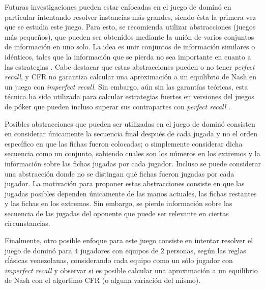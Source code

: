 Futuras investigaciones pueden estar enfocadas en el juego de dominó en particular intentando resolver instancias más grandes, siendo ésta la primera vez que se estudia este juego. Para esto, se recomienda utilizar abstracciones (juegos más pequeños), que pueden ser obtenidos mediante la unión de varios conjuntos de información en uno solo. La idea es unir conjuntos de información similares o idénticos, tales que la información que se pierda no sea importante en cuanto a las estrategias \cite[pp.~71-72]{bib:thesis-marc-lanctot}. Cabe destacar que estas abstracciones pueden o no tener \textit{perfect recall}, y CFR no garantiza calcular una aproximación a un equilibrio de Nash en un juego con \textit{imperfect recall}. Sin embargo, aún sin las garantías teóricas, esta técnica ha sido utilizada para calcular estrategias fuertes en versiones del juegos de póker que pueden incluso superar sus contrapartes con \textit{perfect recall} \cite{bib:imperfect-recall}.

Posibles abstracciones que pueden ser utilizadas en el juego de dominó consisten en considerar únicamente la secuencia final después de cada jugada y no el orden específico en que las fichas fueron colocadas; o simplemente considerar dicha secuencia como un conjunto, sabiendo cuales son los números en los extremos y la información sobre las fichas jugadas por cada jugador. Incluso se puede considerar una abstracción donde no se distingan qué fichas fueron jugadas por cada jugador. La motivación para proponer estas abstracciones consiste en que las jugadas posibles dependen únicamente de las manos actuales, las fichas restantes y las fichas en los extremos. Sin embargo, se pierde información sobre las secuencia de las jugadas del oponente que puede ser relevante en ciertas circunstancias.

Finalmente, otro posible enfoque para este juego consiste en intentar resolver el juego de dominó para $4$ jugadores con equipos de $2$ personas, según las reglas cĺásicas venezolanas, considerando cada equipo como un sólo jugador con \textit{imperfect recall} y observar si es posible calcular una aproximación a un equilibrio de Nash con el algortimo CFR (o alguna variación del mismo).
